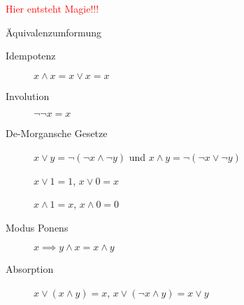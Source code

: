 \documentclass[../../main.tex]{subfiles}
\begin{document}
    \textcolor{red}{Hier entsteht Magie!!!}
    
    \begin{nutshell}{Äquivalenzumformung}
        \begin{description}
            \item[Idempotenz] $x\land x = x\lor x = x$
            \item[Involution] $\lnot\lnot x = x$
            \item[De-Morgansche Gesetze] $x\lor y = \lnot(\lnot x \land \lnot y)$ und $x\land y = \lnot(\lnot x \lor \lnot y)$
            \item[] $x \lor 1 = 1$, $x\lor 0 = x$
            \item[] $x \land 1 = x$, $x\land 0 = 0$
            \item[Modus Ponens] $x \implies y \land x = x\land y$
            \item[Absorption] $x\lor (x \land y) = x$, $x\lor (\lnot x \land y) = x\lor y$
        \end{description}
    \end{nutshell}
\end{document}
